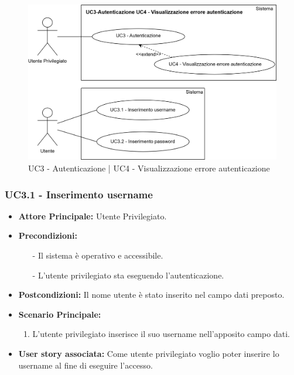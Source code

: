 \documentclass[11pt]{article}
\begin{document}
\begin{justify}
\begin{figure}[ht]
    \centering
    \includegraphics[width=0.5\linewidth]{UC3-UC4image.png}
    \caption{UC3 - Autenticazione | UC4 - Visualizzazione errore autenticazione}
    \label{fig:UC3 e UC4}
\end{figure}

\subsubsection{\textbf{UC3.1 - Inserimento username}}
\begin{itemize}
     \item \textbf{Attore Principale:} Utente Privilegiato.
     \item \textbf{Precondizioni:} 
            \begin{itemize}
                \item [-] Il sistema è operativo e accessibile.
                \item [-] L'utente privilegiato sta eseguendo l'autenticazione.
            \end{itemize}
     \item \textbf{Postcondizioni:} Il nome utente è stato inserito nel campo dati preposto.
     \item \textbf{Scenario Principale:}
     \begin{enumerate}
         \item L'utente privilegiato inserisce il suo username nell'apposito campo dati.
     \end{enumerate}
     \item \textbf{User story associata:} Come utente privilegiato voglio poter inserire lo username al fine di eseguire l'accesso.
\end{itemize}


\end{justify}
\end{document}
